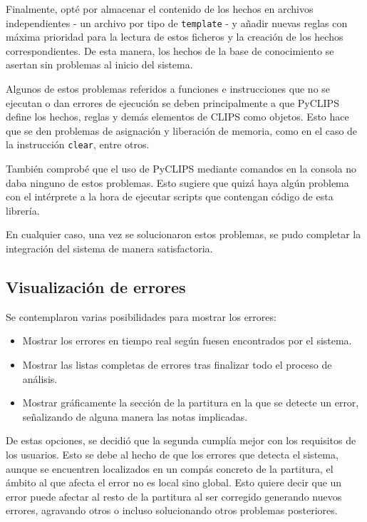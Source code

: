 Finalmente, opté por almacenar el contenido de los hechos en archivos independientes - un archivo por tipo de \texttt{template} - y añadir nuevas reglas con máxima prioridad para la lectura de estos ficheros y la creación de los hechos correspondientes. De esta manera, los hechos de la base de conocimiento se asertan sin problemas al inicio del sistema.

\bigskip
Algunos de estos problemas referidos a funciones e instrucciones que no se ejecutan o dan errores de ejecución se deben principalmente a que PyCLIPS define los hechos, reglas y demás elementos de CLIPS como objetos. Esto hace que se den problemas de asignación y liberación de memoria, como en el caso de la instrucción \texttt{clear}, entre otros. 

También comprobé que el uso de PyCLIPS mediante comandos en la consola no daba ninguno de estos problemas. Esto sugiere que quizá haya algún problema con el intérprete a la hora de ejecutar scripts que contengan código de esta librería.

\bigskip
En cualquier caso, una vez se solucionaron estos problemas, se pudo completar la integración del sistema de manera satisfactoria.

\subsection{Visualización de errores}

Se contemplaron varias posibilidades para mostrar los errores:

\begin{itemize}
	\item Mostrar los errores en tiempo real según fuesen encontrados por el sistema.
	\item Mostrar las listas completas de errores tras finalizar todo el proceso de análisis.
	\item Mostrar gráficamente la sección de la partitura en la que se detecte un error, señalizando de alguna manera las notas implicadas.
\end{itemize}

\bigskip
\bigskip

De estas opciones, se decidió que la segunda cumplía mejor con los requisitos de los usuarios. Esto se debe al hecho de que los errores que detecta el sistema, aunque se encuentren localizados en un compás concreto de la partitura, el ámbito al que afecta el error no es local sino global. Esto quiere decir que un error puede afectar al resto de la partitura al ser corregido generando nuevos errores, agravando otros o incluso solucionando otros problemas posteriores. 

